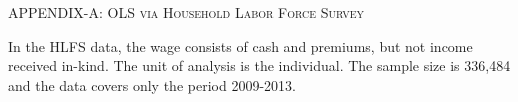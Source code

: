 \documentclass[12pt,author-year]{article}
\begin{document}

\iffalse 

\pagebreak
\begin{center}
	\label{AppendixA}
	\textsc{\large{APPENDIX-A: OLS via Household Labor Force Survey}}
\end{center}

In the HLFS data, the wage consists of cash and premiums, but not income received in-kind. The unit of analysis is the individual. The sample size is 336,484 and the data covers only the period 2009-2013.

\renewcommand{\thetable}{A\arabic{table}} 
\setcounter{table}{0}  
\end{document}
